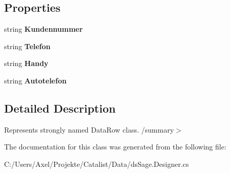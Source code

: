 \subsection*{Properties}
\begin{DoxyCompactItemize}
\item 
string {\bfseries Kundennummer}\hypertarget{class_products_1_1_data_1_1ds_sage_1_1_kontaktnummer_row_af6110be7b5dee525b3dd86d04568e04c}{}\label{class_products_1_1_data_1_1ds_sage_1_1_kontaktnummer_row_af6110be7b5dee525b3dd86d04568e04c}

\item 
string {\bfseries Telefon}\hypertarget{class_products_1_1_data_1_1ds_sage_1_1_kontaktnummer_row_ac8930849e4f1851b7a8e03810fa72f8d}{}\label{class_products_1_1_data_1_1ds_sage_1_1_kontaktnummer_row_ac8930849e4f1851b7a8e03810fa72f8d}

\item 
string {\bfseries Handy}\hypertarget{class_products_1_1_data_1_1ds_sage_1_1_kontaktnummer_row_aa0db75060b786f3df63ce7ac2cd8f743}{}\label{class_products_1_1_data_1_1ds_sage_1_1_kontaktnummer_row_aa0db75060b786f3df63ce7ac2cd8f743}

\item 
string {\bfseries Autotelefon}\hypertarget{class_products_1_1_data_1_1ds_sage_1_1_kontaktnummer_row_adf31795c9660c5e572f48250154fd6df}{}\label{class_products_1_1_data_1_1ds_sage_1_1_kontaktnummer_row_adf31795c9660c5e572f48250154fd6df}

\end{DoxyCompactItemize}


\subsection{Detailed Description}
Represents strongly named Data\+Row class. /summary$>$ 

The documentation for this class was generated from the following file\+:\begin{DoxyCompactItemize}
\item 
C\+:/\+Users/\+Axel/\+Projekte/\+Catalist/\+Data/ds\+Sage.\+Designer.\+cs\end{DoxyCompactItemize}

